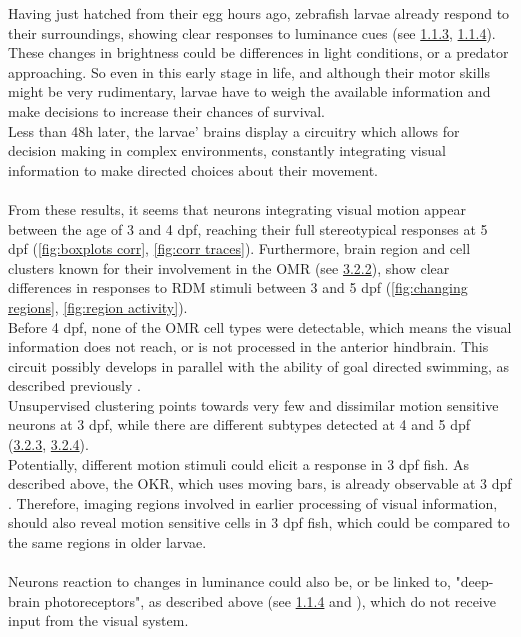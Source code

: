 \documentclass[12pt, a4paper, oneside]{article}
\begin{document}
Having just hatched from their egg hours ago, zebrafish larvae already respond to their surroundings, showing clear responses to luminance cues (see \hyperref[sec:phototaxis]{1.1.3}, \hyperref[sec:development]{1.1.4}).\\
These changes in brightness could be differences in light conditions, or a predator approaching. So even in this early stage in life, and although their motor skills might be very rudimentary, larvae have to weigh the available information and make decisions to increase their chances of survival.\\
Less than 48h later, the larvae' brains display a circuitry which allows for decision making in complex environments, constantly integrating visual information to make directed choices about their movement.\\
\\
From these results, it seems that neurons integrating visual motion appear between the age of 3 and 4 dpf, reaching their full stereotypical responses at 5 dpf (\autoref{fig:boxplots corr}, \autoref{fig:corr traces}).
Furthermore, brain region and cell clusters known for their involvement in the OMR (see \hyperref[sec:region diff res]{3.2.2}),
show clear differences in responses to RDM stimuli between 3 and 5 dpf (\autoref{fig:changing regions}, \autoref{fig:region activity}).\\
Before 4 dpf, none of the OMR cell types were detectable, which means the visual information does not reach, or is not processed in the anterior hindbrain. This circuit possibly develops in parallel with the ability of goal directed swimming, as described previously \parencite{mercierRefinementLocomotorActivity2025a}.\\
Unsupervised clustering points towards very few and dissimilar motion sensitive neurons at 3 dpf, while there are different subtypes detected at 4 and 5 dpf (\hyperref[sec;res hdbscan]{3.2.3}, \hyperref[sec:num clusters]{3.2.4}).\\
Potentially, different motion stimuli could elicit a response in 3 dpf fish. As described above, the OKR, which uses moving bars, is already observable at 3 dpf \parencite{orgerBehavioralScreeningAssays2004b}. Therefore, imaging regions involved in earlier processing of visual information, should also reveal motion sensitive cells in 3 dpf fish, which could be compared to the same regions in older larvae.\\
\\
Neurons reaction to changes in luminance could also be, or be linked to, "deep-brain photoreceptors", as described above (see \hyperref[sec:phototaxis]{1.1.4} and \cite{fernandesEnlighteningBrainLinking2013}), which do not receive input from the visual system.
\end{document}
